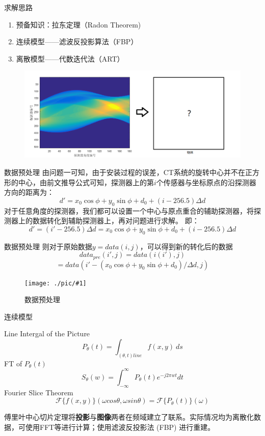 \documentclass{beamer}
\newcommand{\midpic}[2]{  \begin{figure}[H]
\centering
\texttt{[image: ./pic/\#1]}\\
\caption{#2}
\end{figure}}
\begin{document}
\begin{frame}{求解思路}
	\begin{enumerate}
		\item 预备知识：拉东定理（Radon Theorem)
		\item 连续模型——滤波反投影算法（FBP）
		\item 离散模型——代数迭代法（ART）
	\end{enumerate}
	\begin{figure}[H]
		\centering
		\includegraphics[width=1\textwidth]{./pic/pro3.png}\\
		\end{figure}
\end{frame}



\begin{frame}{数据预处理}
	由问题一可知，由于安装过程的误差，CT系统的旋转中心并不在正方形的中心，由前文推导公式可知，探测器上的第\(i\)个传感器与坐标原点的沿探测器方向的距离为：
	\[d' = x_0\cos\phi + y_0\sin\phi + d_0 +  (i - 256.5)\Delta d\]
	对于任意角度的探测器，我们都可以设置一个中心与原点重合的辅助探测器，将探测器上的数据转化到辅助探测器上，再对问题进行求解。
	即：
	\[d' = (i' - 256.5)\Delta d = x_0\cos\phi + y_0\sin\phi + d_0 +  (i - 256.5)\Delta d\]
\end{frame}



\begin{frame}{数据预处理}
	则对于原始数据\( y = data(i,j)\)，可以得到新的转化后的数据
	\[data_{pre}(i',j) = data(i(i'),j)\]
	\[ = data(i' - (x_0\cos\phi + y_0\sin\phi + d_0)/\Delta d,j)\]
	\midpic{datapre3.png}{数据预处理}
\end{frame}



\begin{frame}{连续模型}
	\begin{theorem}	
		Line Intergal of the Picture
		\[ P_\theta (t) = \int_{(\theta, t) line}f(x, y)\ ds \]
		FT of $P_\theta (t)$
		\[S_\theta (w) = \int_{-\infty}^{\infty}P_\theta (t) e^{-j2\pi wt}dt \]
		Fourier Slice Theorem  
		\[\mathcal{F}\{f(x,y)\}(\omega cos\theta,\omega sin\theta)=\mathcal{F}\{P_\theta(t)\}(\omega)\]
	\end{theorem}
	  
	\footnotesize 傅里叶中心切片定理将\textbf{投影}与\textbf{图像}两者在频域建立了联系。实际情况均为离散化数据，可使用FFT等进行计算；使用滤波反投影法 (FBP) 进行重建。
	  
\end{frame}
  
\end{document}

